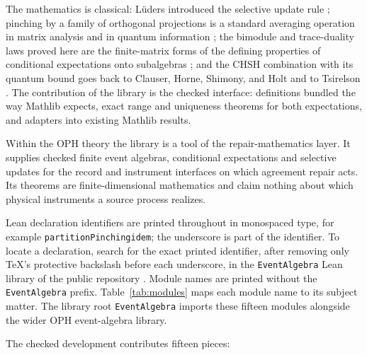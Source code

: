 \documentclass[11pt]{article}
\renewcommand{\_}{\textunderscore\allowbreak}
\theoremstyle{remark}
\begin{document}
The mathematics is classical: L\"uders introduced the selective update rule
\cite{lueders1950,buschlahti2009}; pinching by a family of orthogonal
projections is a standard averaging operation in matrix analysis
\cite{bhatia2000} and in quantum information \cite{hayashi2017}; the bimodule
and trace-duality laws proved here are the finite-matrix forms of the
defining properties of conditional expectations onto subalgebras
\cite{umegaki1954,takesaki1972}; and the CHSH combination with its quantum
bound goes back to Clauser, Horne, Shimony, and Holt \cite{chsh1969} and to
Tsirelson \cite{tsirelson1980}. The contribution of the library is the
checked interface: definitions bundled the way Mathlib expects, exact range
and uniqueness theorems for both expectations, and adapters into existing
Mathlib results.

Within the OPH theory the library is a tool of the repair-mathematics layer.
It supplies checked finite event algebras, conditional expectations and
selective updates for the record and instrument interfaces on which
agreement repair acts. Its theorems are finite-dimensional mathematics and
claim nothing about which physical instruments a source process realizes.

Lean declaration identifiers are printed throughout in monospaced type, for
example \texttt{partitionPinching\_idem}; the underscore is part of the
identifier. To locate a declaration, search for the exact printed identifier,
after removing only TeX's protective backslash before each underscore, in the
\texttt{EventAlgebra} Lean library of the public repository
\cite{observerPatchHolographyRepo}. Module names are printed without the
\texttt{EventAlgebra} prefix. Table~\ref{tab:modules} maps each module
name to its subject matter. The library root \texttt{EventAlgebra}
imports these fifteen modules alongside the wider OPH event-algebra library.

The checked development contributes fifteen pieces:
\end{document}
